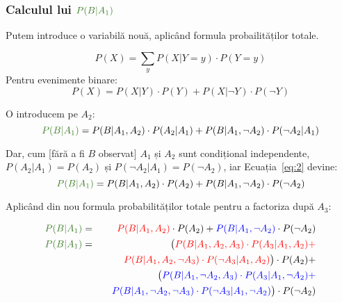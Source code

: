 \documentclass[12pt]{article}
\begin{document}
\subsubsection*{Calculul lui ${\color{OliveGreen}P(B \vert A_1)}$}
\label{step2}

Putem introduce o variabilă nouă, aplicând formula probailităților
totale.

\begin{framed}
  \begin{equation*}
    P(X) = \displaystyle\sum_{y}P(X \vert Y=y) \cdot P(Y=y)
  \end{equation*}
  Pentru evenimente binare:
  \begin{equation*}
    P(X) = P(X \vert Y) \cdot P(Y) + P(X \vert \neg Y) \cdot P(\neg Y)
  \end{equation*}
\end{framed}


 O introducem pe $A_2$:
\begin{equation}
  \label{eq:2}
  {\color{OliveGreen} P(B \vert A_1)} = P(B \vert A_1, A_2) \cdot P(A_2 \vert A_1) + P(B \vert A_1, \neg A_2) \cdot P(\neg A_2 \vert A_1)
\end{equation}

Dar, cum [fără a fi $B$ observat] $A_1$ și $A_2$ sunt condițional
independente, $P(A_2 \vert A_1) = P(A_2)$ și $P(\neg A_2 \vert A_1) =
P(\neg A_2)$, iar Ecuația~\ref{eq:2} devine:
\begin{equation}
  \label{eq:3}
  {\color{OliveGreen} P(B \vert A_1)} = P(B \vert A_1, A_2) \cdot P(A_2) + P(B \vert A_1, \neg A_2) \cdot P(\neg A_2)
\end{equation}

Aplicând din nou formula probabilităților totale pentru a factoriza
după $A_3$:

\begin{eqnarray*}
  \label{eq:4}
  {\color{OliveGreen} P(B \vert A_1)} & = & {\color{red} P(B \vert A_1, A_2)} \cdot P(A_2) + {\color{blue} P(B \vert A_1, \neg A_2)} \cdot P(\neg A_2) \\
  {\color{OliveGreen} P(B \vert A_1)} & = & \big( {\color{red} P(B \vert A_1, A_2, A_3) \cdot P(A_3 \vert A_1, A_2) + }\\
  & & 
  {\color{red} \quad P(B \vert A_1, A_2, \neg A_3) \cdot P(\neg A_3 \vert A_1, A_2)} \big) \cdot P(A_2) + \\
  &  & \big( {\color{blue} P(B \vert A_1, \neg A_2, A_3) \cdot P(A_3 \vert A_1, \neg A_2) + }\\
  & & {\color{blue}\quad P(B \vert A_1, \neg A_2, \neg A_3) \cdot P(\neg A_3 \vert A_1, \neg A_2)} \big) \cdot P(\neg A_2)
\end{eqnarray*}
\end{document}
